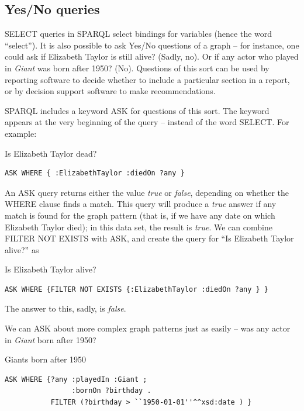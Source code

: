 \subsection{Yes/No queries}

SELECT queries in SPARQL select bindings for variables (hence the word
``select''). It is also possible to ask Yes/No questions of a graph --
for instance, one could ask if Elizabeth Taylor is still alive? (Sadly,
no). Or if any actor who played in \emph{Giant} was born after 1950?
(No). Questions of this sort can be used by reporting software to decide
whether to include a particular section in a report, or by decision
support software to make recommendations.

SPARQL includes a keyword ASK for questions of this sort. The keyword
appears at the very beginning of the query -- instead of the word
SELECT. For example:

\begin{query}Is Elizabeth Taylor dead?\end{query}
\begin{lstlisting}
ASK WHERE { :ElizabethTaylor :diedOn ?any }
\end{lstlisting}

An ASK query returns either the value \emph{true} or \emph{false}, depending on 
whether the WHERE clause finds a match.  This query will produce a \emph{true} answer if any match is found for the
graph pattern (that is, if we have any date on which Elizabeth Taylor
died); in this data set, the result is \emph{true}. We can combine FILTER NOT
EXISTS with ASK, and create the query for ``Is Elizabeth Taylor alive?''
as

\begin{query}Is Elizabeth Taylor alive?\end{query}
\begin{lstlisting}
ASK WHERE {FILTER NOT EXISTS {:ElizabethTaylor :diedOn ?any } }
\end{lstlisting}

The answer to this, sadly, is \emph{false}.

We can ASK about more complex graph patterns just as easily -- was any
actor in \emph{Giant} born after  1950?

\begin{query}Giants born after 1950\end{query}
\begin{lstlisting}
ASK WHERE {?any :playedIn :Giant ;
                :bornOn ?birthday .
           FILTER (?birthday > ``1950-01-01''^^xsd:date ) }
\end{lstlisting}

